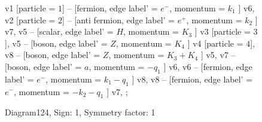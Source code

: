 \documentclass{revtex4}
\begin{document}
\begin{figure}[!htb]
\begin{center}
{    %
v1 [particle = \(1\)] -- [fermion, edge label' = \(e^{-}\), momentum = \(k_{1}\) ] v6, 
v2 [particle = \(2\)] -- [anti fermion, edge label' = \(e^{+}\), momentum = \(k_{2}\) ] v7, 
v5 -- [scalar, edge label' = \(H\), momentum = \(K_{3}\) ] v3 [particle = \(3\)], 
v5 -- [boson, edge label' = \(Z\), momentum = \(K_{4}\) ] v4 [particle = \(4\)], 
v8 -- [boson, edge label' = \(Z\), momentum = \(K_{3} + K_{4}\) ] v5, 
v7 -- [boson, edge label' = \(a\), momentum = \(-q_{1}\) ] v6, 
v6 -- [fermion, edge label' = \(e^{-}\), momentum = \(k_{1} - q_{1}\) ] v8, 
v8 -- [fermion, edge label' = \(e^{-}\), momentum = \(-k_{2} - q_{1}\) ] v7, 
};
\end{center}
\caption{Diagram124, Sign: 1, Symmetry factor: 1}
\end{figure}
\newpage
\end{document}
